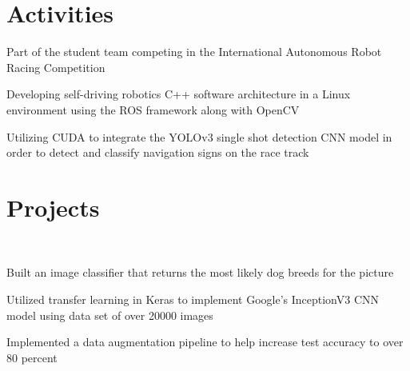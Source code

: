 \documentclass[]{deedy-resume-openfont}
\begin{document}
\begin{minipage}[t]{0.66\textwidth}

\section{Activities}
\begin{tightemize}
\item Part of the student team competing in the International Autonomous Robot Racing Competition
\item Developing self-driving robotics C++ software architecture in a Linux environment using the ROS framework along with OpenCV
\item Utilizing CUDA to integrate the YOLOv3 single shot detection CNN model in order to detect and classify navigation signs on the race track
\end{tightemize}
\sectionsep


\section{Projects}
 \\
\begin{tightemize}
\item Built an image classifier that returns the most likely dog breeds for the picture
\item Utilized transfer learning in Keras to implement Google's InceptionV3 CNN model using data set of over 20000 images
\item Implemented a data augmentation pipeline to help increase test accuracy to over 80 percent 
\end{tightemize}
\sectionsep


\end{minipage} 
\end{document}
